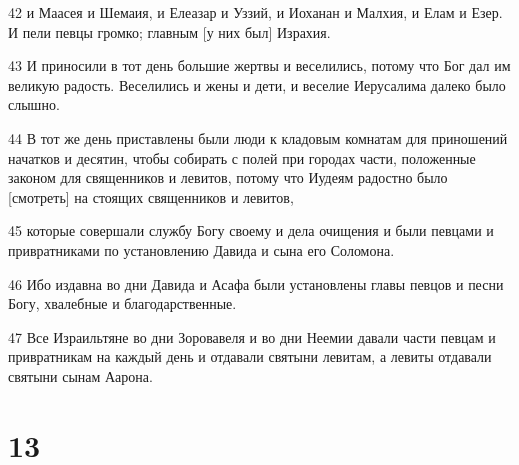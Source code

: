 \par 42 и Маасея и Шемаия, и Елеазар и Уззий, и Иоханан и Малхия, и Елам и Езер. И пели певцы громко; главным [у них был] Израхия.
\par 43 И приносили в тот день большие жертвы и веселились, потому что Бог дал им великую радость. Веселились и жены и дети, и веселие Иерусалима далеко было слышно.
\par 44 В тот же день приставлены были люди к кладовым комнатам для приношений начатков и десятин, чтобы собирать с полей при городах части, положенные законом для священников и левитов, потому что Иудеям радостно было [смотреть] на стоящих священников и левитов,
\par 45 которые совершали службу Богу своему и дела очищения и были певцами и привратниками по установлению Давида и сына его Соломона.
\par 46 Ибо издавна во дни Давида и Асафа были установлены главы певцов и песни Богу, хвалебные и благодарственные.
\par 47 Все Израильтяне во дни Зоровавеля и во дни Неемии давали части певцам и привратникам на каждый день и отдавали святыни левитам, а левиты отдавали святыни сынам Аарона.

\chapter{13}

